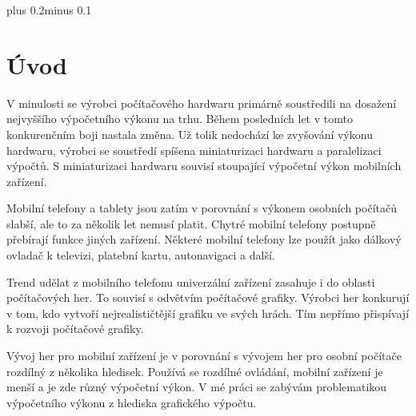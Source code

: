 \documentclass[11pt,twoside,a4paper]{book}
\begin{document}
\mainbodystarts
\normalfont
{}\baselineskip plus 0.2\baselineskip minus 0.1\baselineskip



% 
% 

\chapter{Úvod}
V minulosti se výrobci počítačového hardwaru primárně soustředili na dosažení nejvyššího výpočetního výkonu na trhu. Během posledních let v tomto konkurenčním boji nastala změna. Už tolik nedochází ke zvyšování výkonu hardwaru, výrobci se soustředí spíše\linebreak na miniaturizaci hardwaru a paralelizaci výpočtů. S miniaturizaci hardwaru souvisí stoupající výpočetní výkon mobilních zařízení. 

Mobilní telefony a tablety jsou zatím v porovnání s výkonem osobních počítačů slabší, ale to za několik let nemusí platit. Chytré mobilní telefony postupně přebírají funkce jiných zařízení. Některé mobilní telefony lze použít jako dálkový ovladač k televizi, platební kartu, autonavigaci a další.

Trend udělat z mobilního telefonu univerzální zařízení zasahuje i do oblasti počítačových her. To souvisí s odvětvím počítačové grafiky. Výrobci her konkurují v tom, kdo vytvoří nejrealističtější grafiku ve svých hrách. Tím nepřímo přispívají k rozvoji počítačové grafiky.

Vývoj her pro mobilní zařízení je v porovnání s vývojem her pro osobní počítače rozdílný z několika hledisek. Používá se rozdílné ovládání, mobilní zařízení je menší a je zde různý výpočetní výkon. V mé práci se zabývám problematikou výpočetního výkonu z hlediska grafického výpočtu.
\end{document}
